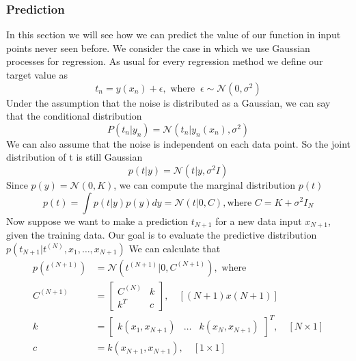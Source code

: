 \documentclass[../main.tex]{subfiles}
\begin{document}
\subsubsection{Prediction}
In this section we will see how we can predict the value of our function in input points never seen before. We consider the case in which we use Gaussian processes for regression. As usual for every regression method we define our target value as
\begin{equation*}
    t_n = y(x_n) + \epsilon,\text{ where } \ \epsilon \sim \mathcal{N}(0, \sigma^2)
\end{equation*}
Under the assumption that the noise is distributed as a Gaussian, we can say that the conditional distribution
\begin{equation}
    P(t_n|y_n) = \mathcal{N}(t_n|y_n(x_n), \sigma^2)
\end{equation}
We can also assume that the noise is independent on each data point. So the joint distribution of t is still Gaussian
\begin{equation}
    p(t|y) = \mathcal{N}(t|y, \sigma^2 I)
\end{equation}
Since $p(y)=\mathcal{N}(0, K)$, we can compute the marginal distribution $p(t)$
\begin{equation}
    p(t) = \int p(t|y)p(y)dy = \mathcal{N}(t|0,C),\text{where } C = K + \sigma^2 I_N
\end{equation}
Now suppose we want to make a prediction $t_{N+1}$ for a new data input $x_{N+1}$, given the training data. Our goal is to evaluate the predictive distribution $p(t_{N+1}|t^{(N)},x_1,\dots,x_{N+1})$\footnotemark {}
We can calculate that
\begin{align*}
    p(t^{(N+1)}) & = \mathcal{N}(t^{(N+1)}|0,C^{(N+1)}), \text{ where}                                      \\
    C^{(N+1)}    & =
    \begin{bmatrix}
        C^{(N)} & k \\
        k^T     & c
    \end{bmatrix}, \quad [(N+1) x (N+1)]                                                                    \\
    k            & = \begin{bmatrix} k(x_1, x_{N+1}) & \dots & k(x_N, x_{N+1}) \end{bmatrix}^T, \quad [N \times 1] \\
    c            & = k(x_{N+1},x_{N+1}), \quad [1 \times 1]
\end{align*}
\end{document}
